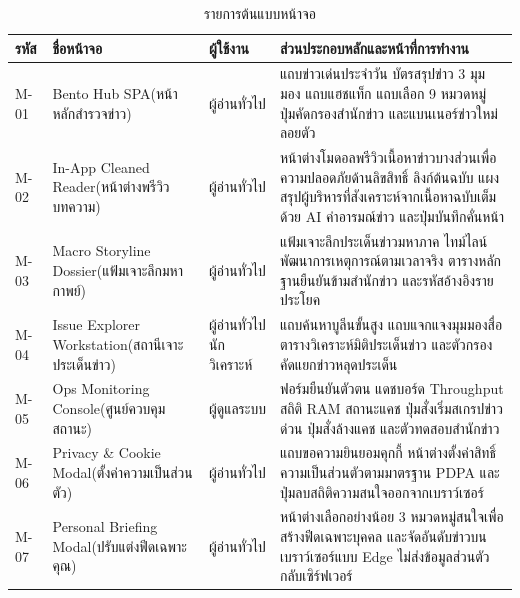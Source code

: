 \begin{table}[H]
\centering
\caption{รายการต้นแบบหน้าจอ}
\label{tab_ui_mockups}
\begin{tabularx}{\textwidth}{|C{1.0cm}|L{3.3cm}|L{2.0cm}|Y|}
\hline
\textbf{รหัส} & \textbf{ชื่อหน้าจอ} & \textbf{ผู้ใช้งาน} & \textbf{ส่วนประกอบหลักและหน้าที่การทำงาน} \\
\hline
M-01 & Bento Hub SPA\newline (หน้าหลักสำรวจข่าว) & ผู้อ่านทั่วไป & แถบข่าวเด่นประจำวัน บัตรสรุปข่าว 3 มุมมอง แถบแฮชแท็ก แถบเลือก 9 หมวดหมู่ ปุ่มคัดกรองสำนักข่าว และแบนเนอร์ข่าวใหม่ลอยตัว \\ \hline
M-02 & In-App Cleaned Reader\newline (หน้าต่างพรีวิวบทความ) & ผู้อ่านทั่วไป & หน้าต่างโมดอลพรีวิวเนื้อหาข่าวบางส่วนเพื่อความปลอดภัยด้านลิขสิทธิ์ ลิงก์ต้นฉบับ แผงสรุปผู้บริหารที่สังเคราะห์จากเนื้อหาฉบับเต็มด้วย AI ค่าอารมณ์ข่าว และปุ่มบันทึกคั่นหน้า \\ \hline
M-03 & Macro Storyline Dossier\newline (แฟ้มเจาะลึกมหากาพย์) & ผู้อ่านทั่วไป & แฟ้มเจาะลึกประเด็นข่าวมหาภาค ไทม์ไลน์พัฒนาการเหตุการณ์ตามเวลาจริง ตารางหลักฐานยืนยันข้ามสำนักข่าว และรหัสอ้างอิงรายประโยค \\ \hline
M-04 & Issue Explorer Workstation\newline (สถานีเจาะประเด็นข่าว) & ผู้อ่านทั่วไป\newline นักวิเคราะห์ & แถบค้นหาบูลีนขั้นสูง แถบแจกแจงมุมมองสื่อ ตารางวิเคราะห์มิติประเด็นข่าว และตัวกรองคัดแยกข่าวหลุดประเด็น \\ \hline
M-05 & Ops Monitoring Console\newline (ศูนย์ควบคุมสถานะ) & ผู้ดูแลระบบ & ฟอร์มยืนยันตัวตน แดชบอร์ด Throughput สถิติ RAM สถานะแคช ปุ่มสั่งเริ่มสเกรปข่าวด่วน ปุ่มสั่งล้างแคช และตัวทดสอบสำนักข่าว \\ \hline
M-06 & Privacy \& Cookie Modal\newline (ตั้งค่าความเป็นส่วนตัว) & ผู้อ่านทั่วไป & แถบขอความยินยอมคุกกี้ หน้าต่างตั้งค่าสิทธิ์ความเป็นส่วนตัวตามมาตรฐาน PDPA และปุ่มลบสถิติความสนใจออกจากเบราว์เซอร์ \\ \hline
M-07 & Personal Briefing Modal\newline (ปรับแต่งฟีดเฉพาะคุณ) & ผู้อ่านทั่วไป & หน้าต่างเลือกอย่างน้อย 3 หมวดหมู่สนใจเพื่อสร้างฟีดเฉพาะบุคคล และจัดอันดับข่าวบนเบราว์เซอร์แบบ Edge ไม่ส่งข้อมูลส่วนตัวกลับเซิร์ฟเวอร์ \\
\hline
\end{tabularx}
\end{table}

